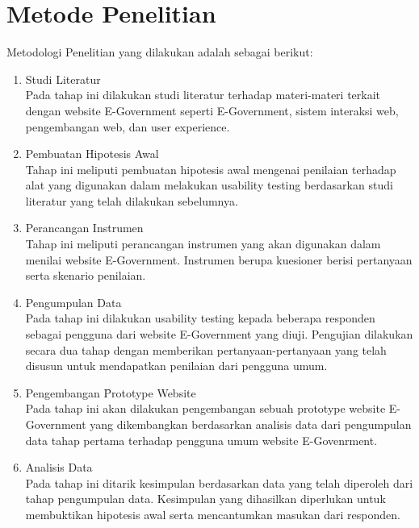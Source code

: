 \section{Metode Penelitian}
Metodologi Penelitian yang dilakukan adalah sebagai berikut:
\begin{enumerate}
	\item Studi Literatur \\
	Pada tahap ini dilakukan studi literatur terhadap materi-materi terkait dengan website E-Government seperti E-Government, sistem interaksi web, pengembangan web, dan user experience.
	\item Pembuatan Hipotesis Awal \\
	Tahap ini meliputi pembuatan hipotesis awal mengenai penilaian terhadap alat yang digunakan dalam melakukan usability testing berdasarkan studi literatur yang telah dilakukan sebelumnya.
	\item Perancangan Instrumen \\
	Tahap ini meliputi perancangan instrumen yang akan digunakan dalam menilai website E-Government. Instrumen berupa kuesioner berisi pertanyaan serta skenario penilaian.
	\item Pengumpulan Data \\
	Pada tahap ini dilakukan usability testing kepada beberapa responden sebagai pengguna dari website E-Government yang diuji. Pengujian dilakukan secara dua tahap dengan memberikan pertanyaan-pertanyaan yang telah disusun untuk mendapatkan penilaian dari pengguna umum.
	\item Pengembangan \f{Prototype} Website \\
	Pada tahap ini akan dilakukan pengembangan sebuah prototype website E-Government yang dikembangkan berdasarkan analisis data dari pengumpulan data tahap pertama terhadap pengguna umum website E-Govenrment.
	\item Analisis Data \\
	Pada tahap ini ditarik kesimpulan berdasarkan data yang telah diperoleh dari tahap pengumpulan data. Kesimpulan yang dihasilkan diperlukan untuk membuktikan hipotesis awal serta mencantumkan masukan dari responden.
\end{enumerate}
\paragraph{}

